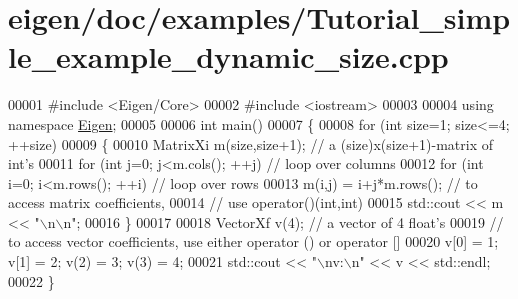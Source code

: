 \hypertarget{eigen_2doc_2examples_2_tutorial__simple__example__dynamic__size_8cpp_source}{}\section{eigen/doc/examples/\+Tutorial\+\_\+simple\+\_\+example\+\_\+dynamic\+\_\+size.cpp}
\label{eigen_2doc_2examples_2_tutorial__simple__example__dynamic__size_8cpp_source}

\begin{DoxyCode}
00001 \textcolor{preprocessor}{#include <Eigen/Core>}
00002 \textcolor{preprocessor}{#include <iostream>}
00003 
00004 \textcolor{keyword}{using namespace }\hyperlink{namespace_eigen}{Eigen};
00005 
00006 \textcolor{keywordtype}{int} main()
00007 \{
00008   \textcolor{keywordflow}{for} (\textcolor{keywordtype}{int} size=1; size<=4; ++size)
00009   \{
00010     MatrixXi m(size,size+1);         \textcolor{comment}{// a (size)x(size+1)-matrix of int's}
00011     \textcolor{keywordflow}{for} (\textcolor{keywordtype}{int} j=0; j<m.cols(); ++j)   \textcolor{comment}{// loop over columns}
00012       \textcolor{keywordflow}{for} (\textcolor{keywordtype}{int} i=0; i<m.rows(); ++i) \textcolor{comment}{// loop over rows}
00013         m(i,j) = i+j*m.rows();       \textcolor{comment}{// to access matrix coefficients,}
00014                                      \textcolor{comment}{// use operator()(int,int)}
00015     std::cout << m << \textcolor{stringliteral}{"\(\backslash\)n\(\backslash\)n"};
00016   \}
00017 
00018   VectorXf v(4); \textcolor{comment}{// a vector of 4 float's}
00019   \textcolor{comment}{// to access vector coefficients, use either operator () or operator []}
00020   v[0] = 1; v[1] = 2; v(2) = 3; v(3) = 4;
00021   std::cout << \textcolor{stringliteral}{"\(\backslash\)nv:\(\backslash\)n"} << v << std::endl;
00022 \}
\end{DoxyCode}
